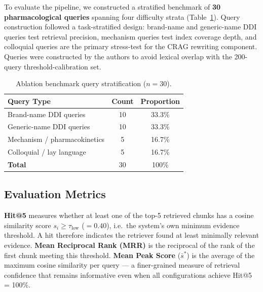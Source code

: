 \documentclass[10pt, twocolumn]{article}
\begin{document}
To evaluate the pipeline, we constructed a stratified benchmark of
\textbf{30 pharmacological queries} spanning four difficulty strata
(Table~\ref{tab:querysets}).  Query construction followed a
task-stratified design: brand-name and generic-name DDI queries test
retrieval precision, mechanism queries test index coverage depth, and
colloquial queries are the primary stress-test for the CRAG rewriting
component.  Queries were constructed by the authors to avoid lexical
overlap with the 200-query threshold-calibration set.

\begin{table}[H]
  \centering
  \caption{Ablation benchmark query stratification ($n=30$).}
  \label{tab:querysets}
  \begin{tabular}{@{}lcc@{}}
    \toprule
    \textbf{Query Type}             & \textbf{Count} & \textbf{Proportion} \\
    \midrule
    Brand-name DDI queries          & 10             & 33.3\%              \\
    Generic-name DDI queries        & 10             & 33.3\%              \\
    Mechanism / pharmacokinetics    & 5              & 16.7\%              \\
    Colloquial / lay language       & 5              & 16.7\%              \\
    \midrule
    \textbf{Total}                  & 30             & 100\%               \\
    \bottomrule
  \end{tabular}
\end{table}

\subsection{Evaluation Metrics}

\textbf{Hit@5} measures whether at least one of the top-5 retrieved
chunks has a cosine similarity score $s_i \geq \tau_{\text{low}}$
($= 0.40$), i.e.\ the system's own minimum evidence threshold.  A hit
therefore indicates the retriever found at least minimally relevant
evidence.  \textbf{Mean Reciprocal Rank (MRR)} is the reciprocal of
the rank of the first chunk meeting this threshold.
\textbf{Mean Peak Score} ($\bar{s}^{*}$) is the average of the
maximum cosine similarity per query — a finer-grained measure of
retrieval confidence that remains informative even when all
configurations achieve Hit@5 = 100\%.

\end{document}

